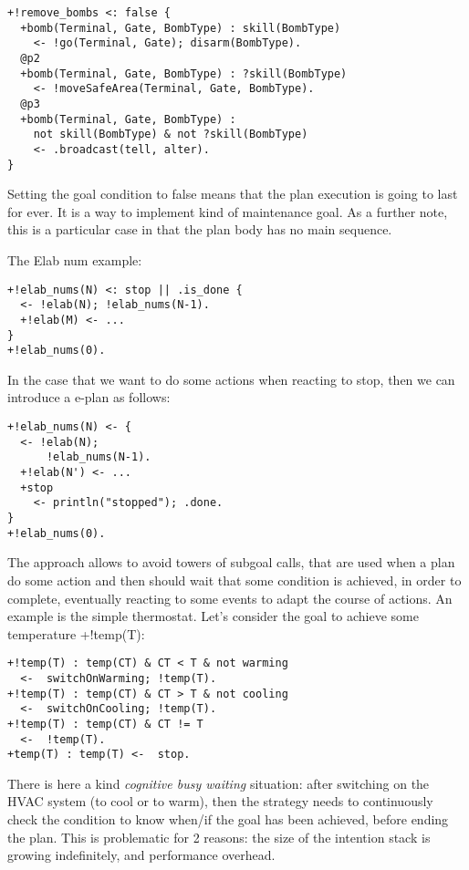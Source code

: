 {\small
\begin{verbatim}
+!remove_bombs <: false {
  +bomb(Terminal, Gate, BombType) : skill(BombType)
    <- !go(Terminal, Gate); disarm(BombType).
  @p2
  +bomb(Terminal, Gate, BombType) : ?skill(BombType)
    <- !moveSafeArea(Terminal, Gate, BombType).
  @p3
  +bomb(Terminal, Gate, BombType) : 
    not skill(BombType) & not ?skill(BombType)
    <- .broadcast(tell, alter).
}
\end{verbatim}}

\noindent Setting the goal condition to false means that  the plan execution is going to last for ever. It is a way to implement kind of maintenance goal.
%
As a further note, this is a particular case in that the plan body has no main sequence.
%


The Elab num example:

{\small
\begin{verbatim}
+!elab_nums(N) <: stop || .is_done {
  <- !elab(N); !elab_nums(N-1).	
  +!elab(M) <- ...
}
+!elab_nums(0).
\end{verbatim}}

\noindent  In the case that we want to do some actions when reacting to stop, then we can introduce a e-plan as follows:

{\small
\begin{verbatim}
+!elab_nums(N) <- {
  <- !elab(N);
      !elab_nums(N-1).
  +!elab(N') <- ...
  +stop 
    <- println("stopped"); .done.		
}
+!elab_nums(0).
\end{verbatim}}

\noindent  The approach allows to avoid towers of subgoal calls, that are used when a plan do some action and then should wait that some condition is achieved, in order to complete, eventually reacting to some events to adapt the course of actions. 
%
An example is the simple thermostat. 
%
Let's consider the goal to achieve some temperature +!temp(T):

{\small
\begin{verbatim}
+!temp(T) : temp(CT) & CT < T & not warming
  <-  switchOnWarming; !temp(T).
+!temp(T) : temp(CT) & CT > T & not cooling
  <-  switchOnCooling; !temp(T).
+!temp(T) : temp(CT) & CT != T 
  <-  !temp(T).
+temp(T) : temp(T) <-  stop.
\end{verbatim}}

\noindent There is here a kind \emph{cognitive busy waiting} situation: after switching on the HVAC system (to cool or to warm), then the strategy needs to continuously check the condition to know when/if the goal has been achieved, before ending the plan.
%
This is problematic for 2 reasons: the size of the intention stack is growing indefinitely, and 
performance overhead. 

